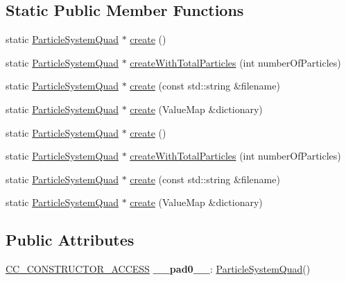 \subsection*{Static Public Member Functions}
\begin{DoxyCompactItemize}
\item 
static \hyperlink{classParticleSystemQuad}{Particle\+System\+Quad} $\ast$ \hyperlink{classParticleSystemQuad_aae19379b7c9e4f3e355284a1ce9d3d47}{create} ()
\item 
static \hyperlink{classParticleSystemQuad}{Particle\+System\+Quad} $\ast$ \hyperlink{classParticleSystemQuad_a74274ad70cb4fe2db9f5a53a18e22823}{create\+With\+Total\+Particles} (int number\+Of\+Particles)
\item 
static \hyperlink{classParticleSystemQuad}{Particle\+System\+Quad} $\ast$ \hyperlink{classParticleSystemQuad_a5c79a0789b3b6313b992dc091bbb8418}{create} (const std\+::string \&filename)
\item 
static \hyperlink{classParticleSystemQuad}{Particle\+System\+Quad} $\ast$ \hyperlink{classParticleSystemQuad_a65fc2d6e119c8d2693affe6e50727cf1}{create} (Value\+Map \&dictionary)
\item 
static \hyperlink{classParticleSystemQuad}{Particle\+System\+Quad} $\ast$ \hyperlink{classParticleSystemQuad_a0cd236071ffdde34ccbe1a38f6c6ebe2}{create} ()
\item 
static \hyperlink{classParticleSystemQuad}{Particle\+System\+Quad} $\ast$ \hyperlink{classParticleSystemQuad_a21ecb08baf720ee1fee803be92b05e0f}{create\+With\+Total\+Particles} (int number\+Of\+Particles)
\item 
static \hyperlink{classParticleSystemQuad}{Particle\+System\+Quad} $\ast$ \hyperlink{classParticleSystemQuad_aaa6f2d6b8468ae6f7d19a1f93ce73da4}{create} (const std\+::string \&filename)
\item 
static \hyperlink{classParticleSystemQuad}{Particle\+System\+Quad} $\ast$ \hyperlink{classParticleSystemQuad_a4f944783dad0ee9d2aa6724a78c516c2}{create} (Value\+Map \&dictionary)
\end{DoxyCompactItemize}
\subsection*{Public Attributes}
\begin{DoxyCompactItemize}
\item 
\mbox{\label{classParticleSystemQuad_a48f005d23dee0e29b4ca26f0157cb74f}} 
\hyperlink{_2cocos2d_2cocos_2base_2ccConfig_8h_a25ef1314f97c35a2ed3d029b0ead6da0}{C\+C\+\_\+\+C\+O\+N\+S\+T\+R\+U\+C\+T\+O\+R\+\_\+\+A\+C\+C\+E\+SS} {\bfseries \+\_\+\+\_\+pad0\+\_\+\+\_\+}\+: \hyperlink{classParticleSystemQuad}{Particle\+System\+Quad}()
\end{DoxyCompactItemize}
